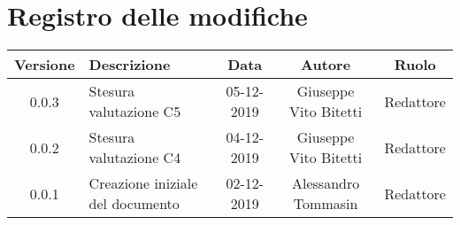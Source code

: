 \section*{Registro delle modifiche}

\begin{center}
	\begin{longtable}{|c|p{5cm}|c|c|c|}
	\hline
	\rowcolor{lighter-grayer}
	\textbf{Versione} & \textbf{Descrizione} & \textbf{Data} & \textbf{Autore} & \textbf{Ruolo} \\
	\hline
	\endfirsthead

	\hline
	0.0.3 & Stesura valutazione C5 & 05-12-2019 & Giuseppe Vito Bitetti & Redattore \\
	\hline
	0.0.2 & Stesura valutazione C4 & 04-12-2019 & Giuseppe Vito Bitetti & Redattore \\
	\hline
	0.0.1 & Creazione iniziale del documento & 02-12-2019 & Alessandro Tommasin & Redattore \\
	\hline
	
	\end{longtable}
\end{center}
